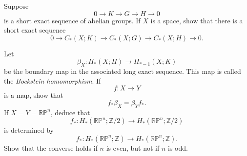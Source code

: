 \begin{problem}
Suppose
\[
0\longrightarrow K\longrightarrow G\longrightarrow H\longrightarrow 0
\]
is a short exact sequence of abelian groups. If \(X\) is a space, show that there is a short exact sequence
\[
0\longrightarrow C_*(X;K)\longrightarrow C_*(X;G)\longrightarrow C_*(X;H)\longrightarrow 0.
\]

Let
\[
\beta_X:H_*(X;H)\longrightarrow H_{*-1}(X;K)
\]
be the boundary map in the associated long exact sequence. This map is called the \emph{Bockstein homomorphism}. If
\[
f:X\longrightarrow Y
\]
is a map, show that
\[
f_*\beta_X=\beta_Y f_*.
\]
If \(X=Y=\mathbb{RP}^n\), deduce that
\[
f_*:H_*(\mathbb{RP}^n;\mathbb Z/2)
\longrightarrow
H_*(\mathbb{RP}^n;\mathbb Z/2)
\]
is determined by
\[
f_*:H_*(\mathbb{RP}^n;\mathbb Z)
\longrightarrow
H_*(\mathbb{RP}^n;\mathbb Z).
\]
Show that the converse holds if \(n\) is even, but not if \(n\) is odd.

\par
\end{problem}

